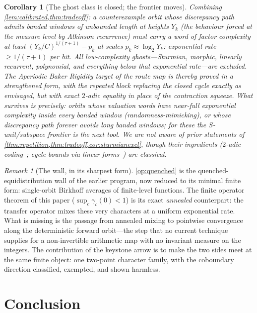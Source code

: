 \documentclass[11pt]{article}
\theoremstyle{plain}
\newtheorem{corollary}{Corollary}
\theoremstyle{definition}
\theoremstyle{remark}
\newtheorem*{remark}{Remark}
\begin{document}
\begin{corollary}[The ghost class is closed; the frontier moves]
\label{cor:ghostclosed}
Combining \cref{lem:calibrated,thm:tradeoff}: a counterexample orbit
whose discrepancy path admits banded windows of unbounded length at
heights $Y_k$ (the behaviour forced at the measure level by Atkinson
recurrence) must carry a word of factor complexity at least
$(Y_k/C)^{1/(\tau+1)}-p_k$ at scales $p_k\approx\log_2Y_k$:
\emph{exponential rate $\ge1/(\tau+1)$ per bit}. All low-complexity
ghosts---Sturmian, morphic, linearly recurrent, polynomial, and
everything below that exponential rate---are excluded. The Aperiodic
Baker Rigidity target of the route map is thereby proved in a
strengthened form, with the repeated block replacing the closed cycle
exactly as envisaged, but with exact $2$-adic equality in place of the
contraction squeeze. What survives is precisely: orbits whose valuation
words have near-full exponential complexity inside every banded window
(randomness-mimicking), or whose discrepancy path forever avoids long
banded windows; for these the $S$-unit/subspace frontier is the next
tool. We are not aware of prior statements of
\cref{thm:repetition,thm:tradeoff,cor:sturmianexcl}, though their
ingredients ($2$-adic coding~\cite{terras1976,everett1977,bernsteinlagarias};
cycle bounds via linear forms~\cite{steiner1977,eliahou1993,simonsdeweger2005}) are
classical.
\end{corollary}

\begin{remark}[The wall, in its sharpest form]
\cref{op:quenched} is the quenched-equidistribution wall of the earlier
program, now reduced to its minimal finite form: single-orbit Birkhoff
averages of finite-level functions. The finite operator theorem of this
paper ($\sup_c\gamma_c(0)<1$) is its exact \emph{annealed} counterpart:
the transfer operator mixes these very characters at a uniform
exponential rate. What is missing is the passage from annealed mixing to
pointwise convergence along the deterministic forward orbit---the step
that no current technique supplies for a non-invertible arithmetic map
with no invariant measure on the integers. The contribution of the
keystone arrow is to make the two sides meet at the same finite object:
one two-point character family, with the coboundary direction
classified, exempted, and shown harmless.
\end{remark}

\section*{Conclusion}
\end{document}
